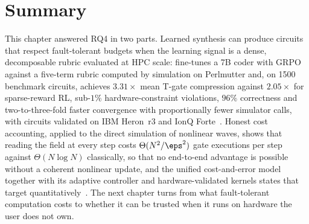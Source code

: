 \section{Summary}\label{sec:syn:summary}

This chapter answered RQ4 in two parts. Learned synthesis can produce circuits that respect fault-tolerant budgets when the learning signal is a dense, decomposable rubric evaluated at HPC scale: \rubriq{} fine-tunes a 7B coder with GRPO against a five-term rubric computed by \cudaq{} simulation on Perlmutter and, on \num{1500} benchmark circuits, achieves $3.31\times$ mean T-gate compression against $2.05\times$ for sparse-reward RL, sub-$1\%$ hardware-constraint violations, $96\%$ correctness and two-to-three-fold faster convergence with proportionally fewer simulator calls, with circuits validated on IBM Heron~r3 and IonQ Forte~\cite{guo2026rubriq}. Honest cost accounting, applied to the direct simulation of nonlinear waves, shows that reading the field at every step costs $\Theta(N^{2}/\eps^{2})$ gate executions per step against $\Theta(N\log N)$ classically, so that no end-to-end advantage is possible without a coherent nonlinear update, and the unified cost-and-error model together with its adaptive controller and hardware-validated kernels states that target quantitatively~\cite{guo2026nonlinearwaves}. The next chapter turns from what fault-tolerant computation costs to whether it can be trusted when it runs on hardware the user does not own.
